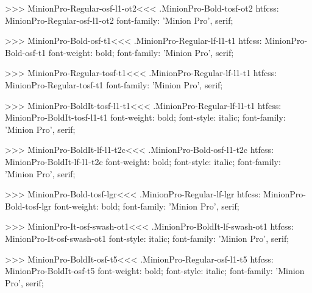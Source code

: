 {>>>
\<MinionPro-Regular-osf-l1-ot2\><<<
.MinionPro-Bold-tosf-ot2
htfcss:  MinionPro-Regular-osf-l1-ot2  font-family: 'Minion Pro', serif;

>>>
\<MinionPro-Bold-osf-t1\><<<
.MinionPro-Regular-lf-l1-t1
htfcss:  MinionPro-Bold-osf-t1  font-weight: bold; font-family: 'Minion Pro', serif;

>>>
\<MinionPro-Regular-tosf-t1\><<<
.MinionPro-Regular-lf-l1-t1
htfcss:  MinionPro-Regular-tosf-t1  font-family: 'Minion Pro', serif;

>>>
\<MinionPro-BoldIt-tosf-l1-t1\><<<
.MinionPro-Regular-lf-l1-t1
htfcss:  MinionPro-BoldIt-tosf-l1-t1  font-weight: bold; font-style: italic; font-family: 'Minion Pro', serif;

>>>
\<MinionPro-BoldIt-lf-l1-t2c\><<<
.MinionPro-Bold-osf-l1-t2c
htfcss:  MinionPro-BoldIt-lf-l1-t2c  font-weight: bold; font-style: italic; font-family: 'Minion Pro', serif;

>>>
\<MinionPro-Bold-tosf-lgr\><<<
.MinionPro-Regular-lf-lgr
htfcss:  MinionPro-Bold-tosf-lgr  font-weight: bold; font-family: 'Minion Pro', serif;

>>>
\<MinionPro-It-osf-swash-ot1\><<<
.MinionPro-BoldIt-lf-swash-ot1
htfcss:  MinionPro-It-osf-swash-ot1  font-style: italic; font-family: 'Minion Pro', serif;

>>>
\<MinionPro-BoldIt-osf-t5\><<<
.MinionPro-Regular-osf-l1-t5
htfcss:  MinionPro-BoldIt-osf-t5  font-weight: bold; font-style: italic; font-family: 'Minion Pro', serif;

}
